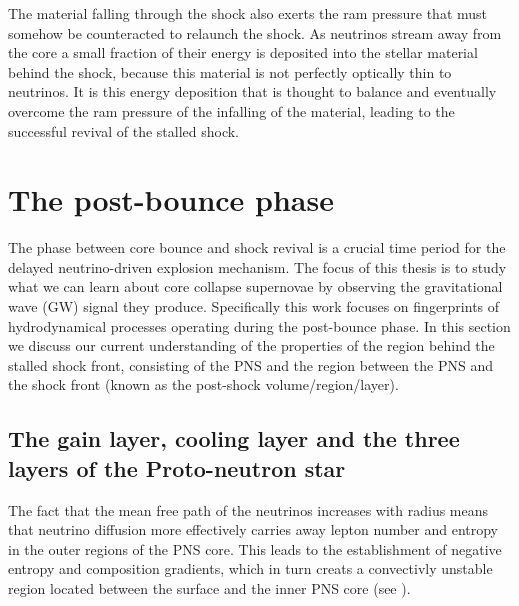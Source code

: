 The material falling through the
shock also exerts the ram pressure that must somehow be counteracted to relaunch the shock.
As neutrinos stream away from the core a small fraction of their energy is deposited into the
stellar material behind the shock, because this material is not perfectly optically thin to neutrinos.
It is this energy deposition that is thought to balance and eventually overcome the ram pressure of the infalling of the material, leading to the successful
revival of the stalled shock.

\section{The post-bounce phase}
The phase between core bounce and shock revival is a crucial time period for the delayed neutrino-driven explosion mechanism. 
The focus of this thesis is to study what we can learn about core collapse supernovae
by observing the gravitational wave (GW) signal they produce. Specifically this work focuses on
fingerprints of hydrodynamical processes operating during the post-bounce phase. 
In this section we discuss our current understanding of the properties of the region behind
the stalled shock front, consisting of the PNS and the region between the PNS and the shock front (known as the post-shock volume/region/layer). 

\subsection{The gain layer, cooling layer and the three layers of the Proto-neutron star}
The fact that the mean free path of the neutrinos increases with radius means that
neutrino diffusion more effectively carries away lepton number and entropy in the 
outer regions of the PNS core. This leads to the establishment of negative 
entropy and composition gradients, which in turn creats a convectivly unstable 
region located between the surface and the inner PNS core (see ).

